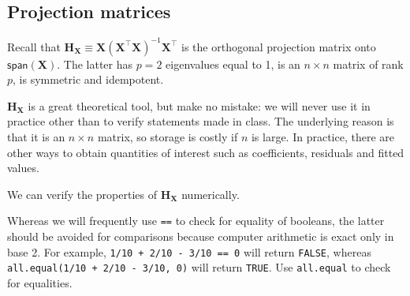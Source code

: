 \documentclass[]{book}
\newenvironment{Shaded}{\begin{snugshade}}{\end{snugshade}}
\newcommand{\CommentTok}[1]{\textcolor[rgb]{0.56,0.35,0.01}{\textit{#1}}}
\newcommand{\DecValTok}[1]{\textcolor[rgb]{0.00,0.00,0.81}{#1}}
\newcommand{\KeywordTok}[1]{\textcolor[rgb]{0.13,0.29,0.53}{\textbf{#1}}}
\newcommand{\NormalTok}[1]{#1}
\newcommand{\OperatorTok}[1]{\textcolor[rgb]{0.81,0.36,0.00}{\textbf{#1}}}
\newcommand{\StringTok}[1]{\textcolor[rgb]{0.31,0.60,0.02}{#1}}
\theoremstyle{definition}
\theoremstyle{definition}
\theoremstyle{definition}
\theoremstyle{remark}
\let\BeginKnitrBlock\begin \let\EndKnitrBlock\end
\begin{document}
\begin{Shaded}
\end{Shaded}

\hypertarget{projection-matrices}{%
\subsection{Projection matrices}\label{projection-matrices}}

Recall that
\(\mathbf{H}_{\mathbf{X}} \equiv \mathbf{X}(\mathbf{X}^\top\mathbf{X})^{-1}\mathbf{X}^\top\)
is the orthogonal projection matrix onto \(\mathsf{span}(\mathbf{X})\).
The latter has \(p=2\) eigenvalues equal to 1, is an \(n \times n\)
matrix of rank \(p\), is symmetric and idempotent.

\BeginKnitrBlock{rmdnote}
\(\mathbf{H}_{\mathbf{X}}\) is a great theoretical tool, but make no
mistake: we will never use it in practice other than to verify
statements made in class. The underlying reason is that it is an
\(n \times n\) matrix, so storage is costly if \(n\) is large. In
practice, there are other ways to obtain quantities of interest such as
coefficients, residuals and fitted values.
\EndKnitrBlock{rmdnote}

We can verify the properties of \(\mathbf{H}_{\mathbf{X}}\) numerically.

\BeginKnitrBlock{rmdcaution}
Whereas we will frequently use \texttt{==} to check for equality of
booleans, the latter should be avoided for comparisons because computer
arithmetic is exact only in base 2. For example,
\texttt{1/10\ +\ 2/10\ -\ 3/10\ ==\ 0} will return \texttt{FALSE},
whereas \texttt{all.equal(1/10\ +\ 2/10\ -\ 3/10,\ 0)} will return
\texttt{TRUE}. Use \texttt{all.equal} to check for equalities.
\EndKnitrBlock{rmdcaution}

\begin{Shaded}
\end{Shaded}
\end{document}
